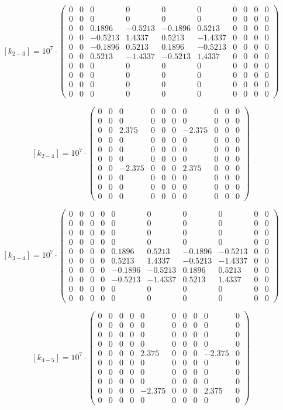 \documentclass[12pt, a4papper, twoside]{article}
\begin{document}
$$ [k_{2-3}]= 10^7 \cdot \left(\begin{matrix}0&0&0&0&0&0&0&0&0&0\\0&0&0&0&0&0&0&0&0&0\\0&0&0.1896&-0.5213&-0.1896&0.5213&0&0&0&0\\0&0&-0.5213&1.4337&0.5213&-1.4337&0&0&0&0\\0&0&-0.1896&0.5213&0.1896&-0.5213&0&0&0&0\\0&0&0.5213&-1.4337&-0.5213&1.4337&0&0&0&0\\0&0&0&0&0&0&0&0&0&0\\0&0&0&0&0&0&0&0&0&0\\0&0&0&0&0&0&0&0&0&0\\0&0&0&0&0&0&0&0&0&0\end{matrix}\right) $$


$$ [k_{2-4}]= 10^7 \cdot \left(\begin{matrix}0&0&0&0&0&0&0&0&0&0\\0&0&0&0&0&0&0&0&0&0\\0&0&2.375&0&0&0&-2.375&0&0&0\\0&0&0&0&0&0&0&0&0&0\\0&0&0&0&0&0&0&0&0&0\\0&0&0&0&0&0&0&0&0&0\\0&0&-2.375&0&0&0&2.375&0&0&0\\0&0&0&0&0&0&0&0&0&0\\0&0&0&0&0&0&0&0&0&0\\0&0&0&0&0&0&0&0&0&0\end{matrix}\right) $$

$$ [k_{3-4}]= 10^7 \cdot \left(\begin{matrix}0&0&0&0&0&0&0&0&0&0\\0&0&0&0&0&0&0&0&0&0\\0&0&0&0&0&0&0&0&0&0\\0&0&0&0&0&0&0&0&0&0\\0&0&0&0&0.1896&0.5213&-0.1896&-0.5213&0&0\\0&0&0&0&0.5213&1.4337&-0.5213&-1.4337&0&0\\0&0&0&0&-0.1896&-0.5213&0.1896&0.5213&0&0\\0&0&0&0&-0.5213&-1.4337&0.5213&1.4337&0&0\\0&0&0&0&0&0&0&0&0&0\\0&0&0&0&0&0&0&0&0&0\end{matrix}\right) $$


$$ [k_{4-5}]= 10^7 \cdot \left(\begin{matrix}0&0&0&0&0&0&0&0&0&0\\0&0&0&0&0&0&0&0&0&0\\0&0&0&0&0&0&0&0&0&0\\0&0&0&0&0&0&0&0&0&0\\0&0&0&0&2.375&0&0&0&-2.375&0\\0&0&0&0&0&0&0&0&0&0\\0&0&0&0&0&0&0&0&0&0\\0&0&0&0&0&0&0&0&0&0\\0&0&0&0&-2.375&0&0&0&2.375&0\\0&0&0&0&0&0&0&0&0&0\end{matrix}\right) $$
\end{document}
